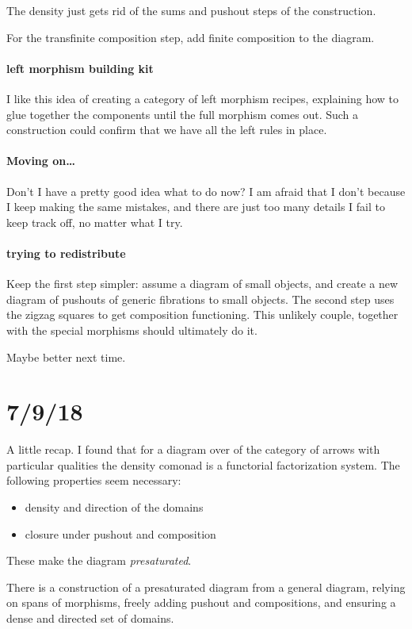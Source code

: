 \documentclass[csh.tex]{subfiles}
\begin{document}
The density just gets rid of the sums and pushout steps of the construction.

For the transfinite composition step, add finite composition to the diagram.

\paragraph{left morphism building kit}
I like this idea of creating a category of left morphism recipes, explaining how to glue together the components until the full morphism comes out. Such a construction could confirm that we have all the left rules in place.

\paragraph{Moving on\dots}
Don't I have a pretty good idea what to do now? I am afraid that I don't because I keep making the same mistakes, and there are just too many details I fail to keep track off, no matter what I try.


\paragraph{trying to redistribute}
Keep the first step simpler: assume a diagram of small objects, and create a new diagram of pushouts of generic fibrations to small objects.
The second step uses the zigzag squares to get composition functioning.
This unlikely couple, together with the special morphisms should ultimately do it.

Maybe better next time.

\section{7/9/18}

A little recap. I found that for a diagram over of the category of arrows with particular qualities the density comonad is a functorial factorization system. The following properties seem necessary:
\begin{itemize}
\item density and direction of the domains
\item closure under pushout and composition
\end{itemize}
These make the diagram \emph{presaturated}.

There is a construction of a presaturated diagram from a general diagram, relying on spans of morphisms, freely adding pushout and compositions, and ensuring a dense and directed set of domains.
\end{document}
